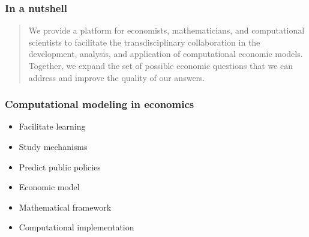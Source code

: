\begin{frame}\frametitle{In a nutshell}
\hspace{1.5cm}
\vspace{0.25cm}

\begin{quote}
	\large
	\raggedright
	\linespread{1.3}\selectfont{}
	We provide a platform for economists, mathematicians, and computational scientists to facilitate the \alert{transdisciplinary collaboration} in the development, analysis, and application of \alert{computational economic models}. 
	\medskip \\
	Together, we expand the set of possible economic questions that we can address and improve the quality of our answers.
\end{quote}

\end{frame}
\begin{frame}\frametitle{Computational modeling in economics}

	\begin{multicols}{2}
	\vspace{0.3cm}
	\begin{itemize}\setlength\itemsep{1em}
	\item Facilitate learning
	\item Study mechanisms
	\item Predict public policies
	\end{itemize}

	\pause

  \vspace{0.3cm}
	\begin{itemize}\setlength\itemsep{1em}
	\item Economic model
	\item Mathematical framework
	\item Computational implementation
	\end{itemize}
	\end{multicols}

\end{frame}

